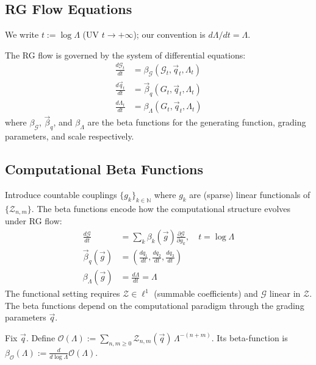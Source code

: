 \subsection{RG Flow Equations}

We write $t:=\log \Lambda$ (UV $t\to+\infty$); our convention is $d\Lambda/dt=\Lambda$.

\begin{definition}
\label{def:rg-flow-equations}
The RG flow is governed by the system of differential equations:
\begin{align}
\frac{d\mathcal{G}_t}{dt} &= \beta_{\mathcal{G}}(\mathcal{G}_t, \vec{q}_t, \Lambda_t) \\
\frac{d\vec{q}_t}{dt} &= \vec{\beta}_q(G_t, \vec{q}_t, \Lambda_t) \\
\frac{d\Lambda_t}{dt} &= \beta_\Lambda(G_t, \vec{q}_t, \Lambda_t)
\end{align}
where $\beta_{\mathcal{G}}$, $\vec{\beta}_q$, and $\beta_\Lambda$ are the beta functions for the generating function, grading parameters, and scale respectively.
\end{definition}

\subsection{Computational Beta Functions}

\begin{definition}
\label{def:computational-beta-functions}
Introduce countable couplings $\{g_k\}_{k \in \mathbb{N}}$ where $g_k$ are (sparse) linear functionals of $\{\mathcal{Z}_{n,m}\}$. The beta functions encode how the computational structure evolves under RG flow:
\begin{align}
\frac{d\mathcal{G}}{dt} &= \sum_k \beta_k(\vec{g}) \frac{\partial \mathcal{G}}{\partial g_k}, \quad t = \log \Lambda \\
\vec{\beta}_q(\vec{g}) &= \left(\frac{dq_1}{dt}, \frac{dq_2}{dt}, \frac{dq_3}{dt}\right) \\
\beta_\Lambda(\vec{g}) &= \frac{d\Lambda}{dt} = \Lambda
\end{align}
The functional setting requires $\mathcal{Z} \in \ell^1$ (summable coefficients) and $\mathcal{G}$ linear in $\mathcal{Z}$. The beta functions depend on the computational paradigm through the grading parameters $\vec{q}$.
\end{definition}

\begin{definition}
\label{def:global-observable}
Fix $\vec{q}$. Define $\mathcal{O}(\Lambda):=\sum_{n,m\ge0}\mathcal{Z}_{n,m}(\vec{q})\,\Lambda^{-(n+m)}$.
Its beta-function is $\beta_\mathcal{O}(\Lambda):=\frac{d}{d\log\Lambda}\mathcal{O}(\Lambda)$.
\end{definition}

